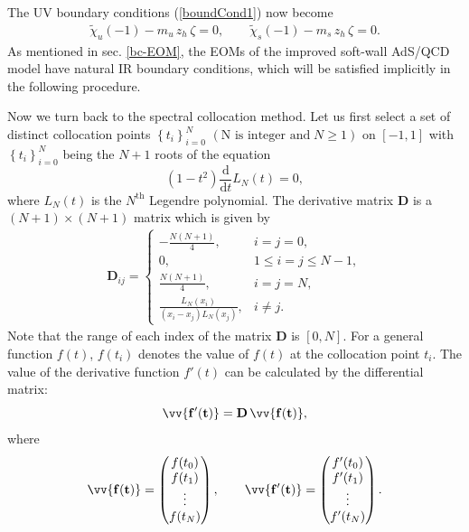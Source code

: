 \documentclass[11pt,a4paper,psfrag]{article}
\begin{document}
The UV boundary conditions (\ref{boundCond1}) now become
\begin{align}\label{boundCond3-1}
\tilde{\chi}_u(-1)-m_u\,z_h\,\zeta=0,  \qquad  \tilde{\chi}_s(-1)-m_s\,z_h\,\zeta=0.
\end{align}
As mentioned in sec. \ref{bc-EOM}, the EOMs of the improved soft-wall AdS/QCD model have natural IR boundary conditions, which will be satisfied implicitly in the following procedure.
\par
Now we turn back to the spectral collocation method. Let us first select a set of distinct collocation points $\left\{ t_i \right\}_{i=0}^{N}$ $\left( \text{N is integer and}\; N\ge 1 \right)$ on $\left[ -1, 1 \right]$ with $\left\{ t_i \right\}_{i=0}^{N}$ being the $N+1$ roots of the equation
\begin{equation}\label{EquationOfCollocationPoints}
(1-t^2)\frac{\mathrm{d}}{\mathrm{d}t}L_{N}(t)=0,
\end{equation}
where $L_{N}(t)$ is the $N^{\mathrm{th}}$ Legendre polynomial. The derivative matrix $\mathbf{D}$ is a $\left( N+1 \right) \times \left( N+1 \right)$ matrix which is given by
\begin{align}\label{diffMatIndex1}
\mathbf{D}_{i j}=
\begin{cases}
-\frac{N(N+1)}{4},&i=j=0,\\
0, &1 \le i=j \le N-1,\\
\frac{N(N+1)}{4},&i=j=N,\\
\frac{L_{N}(x_{i})}{(x_{i}-x_{j})L_{N}(x_{j})},&i \neq j.
\end{cases}
\end{align}
Note that the range of each index of the matrix $\mathbf{D}$ is $\left[0,N\right]$. For a general function $f(t)$, $f(t_{i})$ denotes the value of $f(t)$ at the collocation point $t_i$. The value of the derivative function $f'(t)$ can be calculated by the differential matrix:
\begin{equation}\label{diffMatIndex2}
\vv{\mathbf{f'(t)}}=\mathbf{D}\, \vv{\mathbf{f(t)}},
\end{equation}
where
\begin{align}\label{generalFunValVecIndex1}
\vv{\mathbf{f(t)}} =\begin{pmatrix} f(t_0) \\ f(t_1) \\ \vdots \\ f(t_N) \end{pmatrix},  \qquad
\vv{\mathbf{f'(t)}} =\begin{pmatrix} f'(t_0) \\ f'(t_1) \\ \vdots \\ f'(t_N) \end{pmatrix}.
\end{align}
\end{document}
